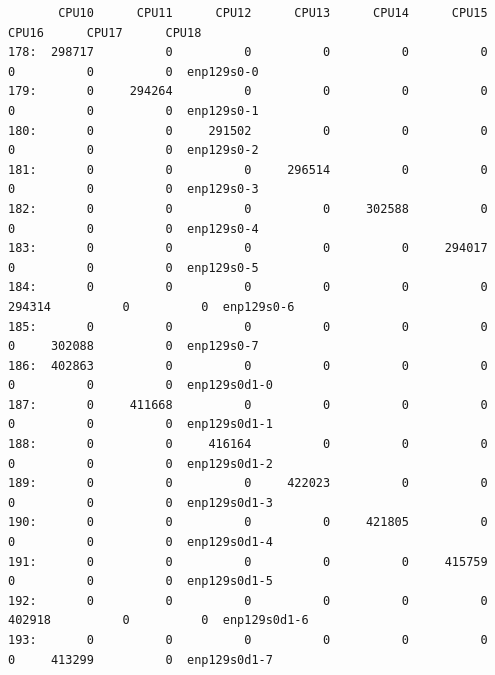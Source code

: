 \begin{landscape}
\vspace*{\fill}
\begin{lstlisting}
       CPU10      CPU11      CPU12      CPU13      CPU14      CPU15      CPU16      CPU17      CPU18
178:  298717          0          0          0          0          0          0          0          0  enp129s0-0
179:       0     294264          0          0          0          0          0          0          0  enp129s0-1
180:       0          0     291502          0          0          0          0          0          0  enp129s0-2
181:       0          0          0     296514          0          0          0          0          0  enp129s0-3
182:       0          0          0          0     302588          0          0          0          0  enp129s0-4
183:       0          0          0          0          0     294017          0          0          0  enp129s0-5
184:       0          0          0          0          0          0     294314          0          0  enp129s0-6
185:       0          0          0          0          0          0          0     302088          0  enp129s0-7
186:  402863          0          0          0          0          0          0          0          0  enp129s0d1-0
187:       0     411668          0          0          0          0          0          0          0  enp129s0d1-1
188:       0          0     416164          0          0          0          0          0          0  enp129s0d1-2
189:       0          0          0     422023          0          0          0          0          0  enp129s0d1-3
190:       0          0          0          0     421805          0          0          0          0  enp129s0d1-4
191:       0          0          0          0          0     415759          0          0          0  enp129s0d1-5
192:       0          0          0          0          0          0     402918          0          0  enp129s0d1-6
193:       0          0          0          0          0          0          0     413299          0  enp129s0d1-7
\end{lstlisting}
\vspace*{\fill}
\end{landscape}

